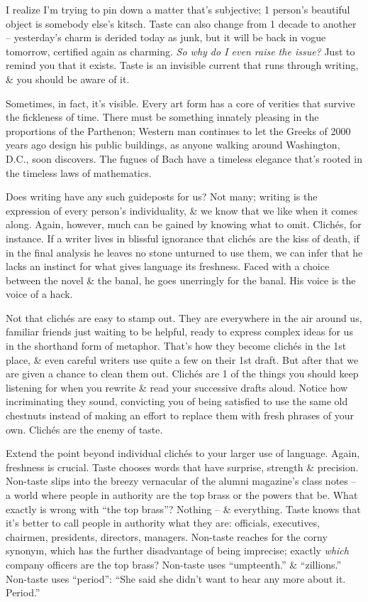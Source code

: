 \documentclass{article}
\numberwithin{equation}{section}
\begin{document}
I realize I'm trying to pin down a matter that's subjective; 1 person's beautiful object is somebody else's kitsch. Taste can also change from 1 decade to another -- yesterday's charm is derided today as junk, but it will be back in vogue tomorrow, certified again as charming. \textit{So why do I even raise the issue?} Just to remind you that it exists. Taste is an invisible current that runs through writing, \& you should be aware of it.

Sometimes, in fact, it's visible. Every art form has a core of verities that survive the fickleness of time. There must be something innately pleasing in the proportions of the Parthenon; Western man continues to let the Greeks of 2000 years ago design his public buildings, as anyone walking around Washington, D.C., soon discovers. The fugues of Bach have a timeless elegance that's rooted in the timeless laws of mathematics.

Does writing have any such guideposts for us? Not many; writing is the expression of every person's individuality, \& we know that we like when it comes along. Again, however, much can be gained by knowing what to omit. Clich\'es, for instance. If a writer lives in blissful ignorance that clich\'es are the kiss of death, if in the final analysis he leaves no stone unturned to use them, we can infer that he lacks an instinct for what gives language its freshness. Faced with a choice between the novel \& the banal, he goes unerringly for the banal. His voice is the voice of a hack.

Not that clich\'es are easy to stamp out. They are everywhere in the air around us, familiar friends just waiting to be helpful, ready to express complex ideas for us in the shorthand form of metaphor. That's how they become clich\'es in the 1st place, \& even careful writers use quite a few on their 1st draft. But after that we are given a chance to clean them out. Clich\'es are 1 of the things you should keep listening for when you rewrite \& read your successive drafts aloud. Notice how incriminating they sound, convicting you of being satisfied to use the same old chestnuts instead of making an effort to replace them with fresh phrases of your own. Clich\'es are the enemy of taste.

Extend the point beyond individual clich\'es to your larger use of language. Again, freshness is crucial. Taste chooses words that have surprise, strength \& precision. Non-taste slips into the breezy vernacular of the alumni magazine's class notes -- a world where people in authority are the top brass or the powers that be. What exactly is wrong with ``the top brass''? Nothing -- \& everything. Taste knows that it's better to call people in authority what they are: officials, executives, chairmen, presidents, directors, managers. Non-taste reaches for the corny synonym, which has the further disadvantage of being imprecise; exactly \textit{which} company officers are the top brass? Non-taste uses ``umpteenth.'' \& ``zillions.'' Non-taste uses ``period'': ``She said she didn't want to hear any more about it. Period.''
\end{document}
